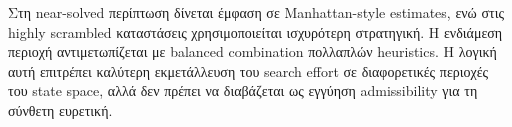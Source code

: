 Στη near-solved περίπτωση δίνεται έμφαση σε Manhattan-style estimates, ενώ στις highly scrambled καταστάσεις χρησιμοποιείται ισχυρότερη στρατηγική. Η ενδιάμεση περιοχή αντιμετωπίζεται με balanced combination πολλαπλών heuristics. Η λογική αυτή επιτρέπει καλύτερη εκμετάλλευση του search effort σε διαφορετικές περιοχές του state space, αλλά δεν πρέπει να διαβάζεται ως εγγύηση admissibility για τη σύνθετη ευρετική.
